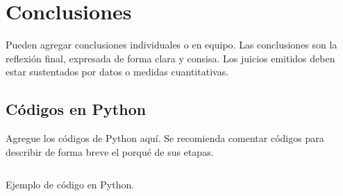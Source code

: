\documentclass{article}
\begin{document}
\section{Conclusiones} %
Pueden agregar conclusiones individuales o en equipo. Las conclusiones son la reflexión final, expresada de forma clara y consisa. Los juicios emitidos deben estar sustentados por datos o medidas cuantitativas.

\printbibliography %

\begin{appendices} %

\section{Códigos en Python} %
Agregue los códigos de Python aquí. Se recomienda comentar códigos para describir de forma breve el porqué de sus etapas.

\begin{listing}[h]
\inputminted{python}{ejemplo.py}
\caption{Ejemplo de código en Python.}
\label{listing:ejemplo}

\end{listing}

\end{appendices}
\end{document}
